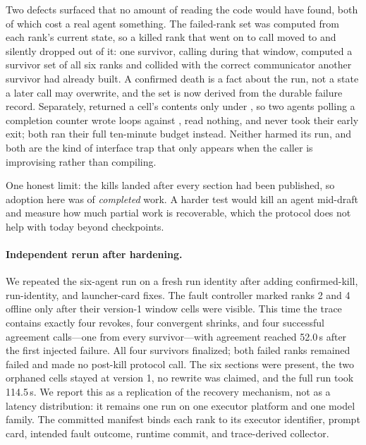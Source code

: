 Two defects surfaced that no amount of reading the code would have found, both
of which cost a real agent something.  The failed-rank set was computed from
each rank's current state, so a killed rank that went on to call
 moved to  and silently dropped out of it:
one survivor, calling  during that window, computed a
survivor set of all six ranks and collided with the correct communicator
another survivor had already built.  A confirmed death is a fact about the run,
not a state a later call may overwrite, and the set is now derived from the
durable failure record.  Separately,  returned a cell's
contents only under , so two agents polling a completion counter
wrote loops against , read nothing, and never took their early
exit; both ran their full ten-minute budget instead.  Neither harmed its run,
and both are the kind of interface trap that only appears when the caller is
improvising rather than compiling.

One honest limit: the kills landed after every section had been published, so
adoption here was of \emph{completed} work.  A harder test would kill an agent
mid-draft and measure how much partial work is recoverable, which the protocol
does not help with today beyond checkpoints.

\paragraph{Independent rerun after hardening.}
We repeated the six-agent run on a fresh run identity after adding confirmed-kill,
run-identity, and launcher-card fixes.  The fault controller marked ranks 2 and
4 offline only after their version-1 window cells were visible.  This time the
trace contains exactly four revokes, four convergent shrinks, and four successful
agreement calls---one from every survivor---with agreement reached 52.0\,s after
the first injected failure.  All four survivors finalized; both failed ranks
remained failed and made no post-kill protocol call.  The six sections were
present, the two orphaned cells stayed at version 1, no rewrite was claimed, and
the full run took 114.5\,s.  We report this as a replication of the recovery
mechanism, not as a latency distribution: it remains one run on one executor
platform and one model family.  The committed manifest binds each rank to its
executor identifier, prompt card, intended fault outcome, runtime commit, and
trace-derived collector.
